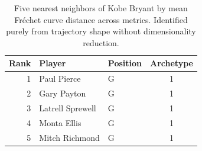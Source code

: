\begin{table}[htbp]
  \centering\small
  \begin{tabular}{rllc}
    \toprule
    Rank & Player & Position & Archetype \\
    \midrule
    1 & Paul Pierce & G & 1 \\
    2 & Gary Payton & G & 1 \\
    3 & Latrell Sprewell & G & 1 \\
    4 & Monta Ellis & G & 1 \\
    5 & Mitch Richmond & G & 1 \\
    \bottomrule
  \end{tabular}
  \caption{Five nearest neighbors of Kobe Bryant by mean Fr\'{e}chet curve distance across metrics. Identified purely from trajectory shape without dimensionality reduction.}
  \label{tab:Kobe_Bryant_frechet_curve_neighbors}
\end{table}

